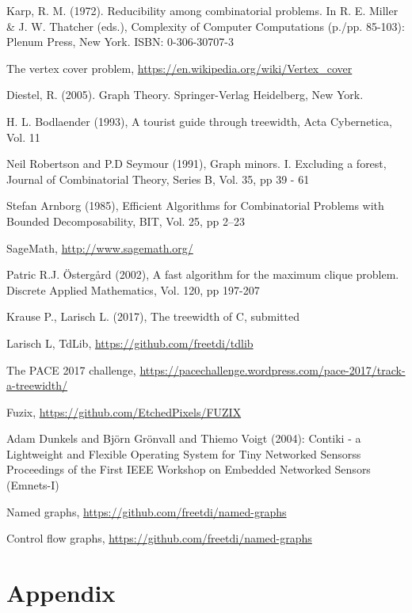 \documentclass[11pt,a4paper]{article}
\begin{document}
\begin{thebibliography}{9}

 Karp, R. M. (1972). Reducibility among combinatorial problems. In R. E. Miller \& J. W. Thatcher (eds.), Complexity of Computer Computations (p./pp. 85-103): Plenum Press, New York. ISBN: 0-306-30707-3

 The vertex cover problem, \url{https://en.wikipedia.org/wiki/Vertex_cover}

 Diestel, R. (2005). Graph Theory. Springer-Verlag Heidelberg, New York. 

 H. L. Bodlaender (1993), A tourist guide through treewidth, Acta Cybernetica, Vol. 11

 Neil Robertson and P.D Seymour (1991), Graph minors. I. Excluding a forest, Journal of Combinatorial Theory, Series B, Vol. 35, pp 39 - 61

 Stefan Arnborg (1985), Efficient Algorithms for Combinatorial Problems with Bounded Decomposability, BIT, Vol. 25, pp 2--23

 SageMath, \url{http://www.sagemath.org/}

 Patric R.J. Östergård (2002), A fast algorithm for the maximum clique problem. Discrete Applied Mathematics, Vol. 120, pp 197-207

 Krause P., Larisch L. (2017), The treewidth of C, submitted

 Larisch L, TdLib, \url{https://github.com/freetdi/tdlib}

 The PACE 2017 challenge, \url{https://pacechallenge.wordpress.com/pace-2017/track-a-treewidth/}

 Fuzix, \url{https://github.com/EtchedPixels/FUZIX}

 Adam Dunkels and Björn Grönvall and Thiemo Voigt (2004): Contiki - a Lightweight and Flexible Operating System for Tiny Networked Sensorss Proceedings of the First IEEE Workshop on Embedded Networked Sensors (Emnets-I)

 Named graphs, \url{https://github.com/freetdi/named-graphs}

 Control flow graphs, \url{https://github.com/freetdi/named-graphs}


\end{thebibliography}

\section{Appendix}
\end{document}
